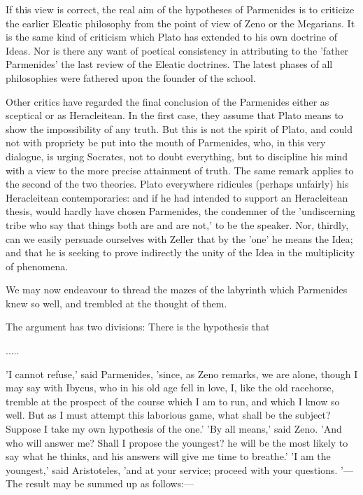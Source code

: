 \documentclass[11pt,letter]{article}
\begin{document}
\par  If this view is correct, the real aim of the hypotheses of Parmenides is to criticize the earlier Eleatic philosophy from the point of view of Zeno or the Megarians. It is the same kind of criticism which Plato has extended to his own doctrine of Ideas. Nor is there any want of poetical consistency in attributing to the 'father Parmenides' the last review of the Eleatic doctrines. The latest phases of all philosophies were fathered upon the founder of the school.

\par  Other critics have regarded the final conclusion of the Parmenides either as sceptical or as Heracleitean. In the first case, they assume that Plato means to show the impossibility of any truth. But this is not the spirit of Plato, and could not with propriety be put into the mouth of Parmenides, who, in this very dialogue, is urging Socrates, not to doubt everything, but to discipline his mind with a view to the more precise attainment of truth. The same remark applies to the second of the two theories. Plato everywhere ridicules (perhaps unfairly) his Heracleitean contemporaries: and if he had intended to support an Heracleitean thesis, would hardly have chosen Parmenides, the condemner of the 'undiscerning tribe who say that things both are and are not,' to be the speaker. Nor, thirdly, can we easily persuade ourselves with Zeller that by the 'one' he means the Idea; and that he is seeking to prove indirectly the unity of the Idea in the multiplicity of phenomena.

\par  We may now endeavour to thread the mazes of the labyrinth which Parmenides knew so well, and trembled at the thought of them.

\par  The argument has two divisions: There is the hypothesis that
 
\par  .....

\par  'I cannot refuse,' said Parmenides, 'since, as Zeno remarks, we are alone, though I may say with Ibycus, who in his old age fell in love, I, like the old racehorse, tremble at the prospect of the course which I am to run, and which I know so well. But as I must attempt this laborious game, what shall be the subject? Suppose I take my own hypothesis of the one.' 'By all means,' said Zeno. 'And who will answer me? Shall I propose the youngest? he will be the most likely to say what he thinks, and his answers will give me time to breathe.' 'I am the youngest,' said Aristoteles, 'and at your service; proceed with your questions. '—The result may be summed up as follows:—
\end{document}

